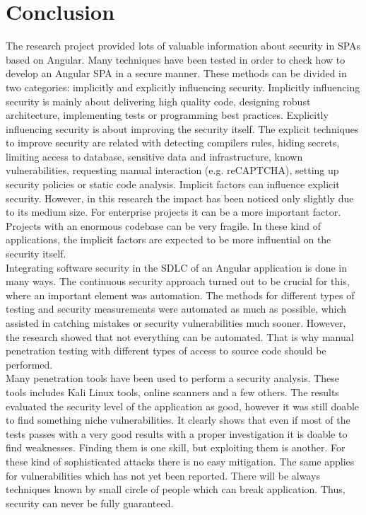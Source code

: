 \documentclass{article} %
\begin{document}
\section{Conclusion}
\normalsize The research project provided lots of valuable information about security in SPAs based on Angular. Many techniques have been tested in order to check how to develop an Angular SPA in a secure manner. These methods can be divided in two categories: implicitly and explicitly influencing security. Implicitly influencing security is mainly about delivering high quality code, designing robust architecture, implementing tests or programming best practices. Explicitly influencing security is about improving the security itself. The explicit techniques to improve security are related with detecting compilers rules, hiding secrets, limiting access to database, sensitive data and infrastructure, known vulnerabilities, requesting manual interaction (e.g. reCAPTCHA), setting up security policies or static code analysis. Implicit factors can influence explicit security. However, in this research the impact has been noticed only slightly due to its medium size. For enterprise projects it can be a more important factor. Projects with an enormous codebase can be very fragile. In these kind of applications, the implicit factors are expected to be more influential on the security itself.\\
\newline
Integrating software security in the SDLC of an Angular application is done in many ways. The continuous security approach turned out to be crucial for this, where an important element was automation. The methods for different types of testing and security measurements were automated as much as possible, which assisted in catching mistakes or security vulnerabilities much sooner. However, the research showed that not everything can be automated. That is why manual penetration testing with different types of access to source code should be performed.\\
\newline
Many penetration tools have been used to perform a security analysis. These tools includes Kali Linux tools, online scanners and a few others. The results evaluated the security level of the application as good, however it was still doable to find something niche vulnerabilities. It clearly shows that even if most of the tests passes with a very good results with a proper investigation it is doable to find weaknesses. Finding them is one skill, but exploiting them is another. For these kind of sophisticated attacks there is no easy mitigation. The same applies for vulnerabilities which has not yet been reported. There will be always techniques known by small circle of people which can break application. Thus, security can never be fully guaranteed.\\
\end{document}
